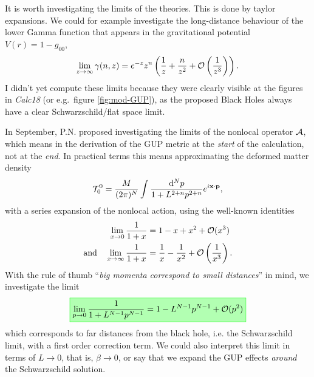 \documentclass[10pt,a4paper]{article}
\newcommand{\highlight}[1]{%
   \fcolorbox{green}{green!30}{$\displaystyle#1$}%
}
\begin{document}
It is worth investigating the limits of the theories. This is done by taylor expansions. We could for example investigate the long-distance behaviour of the lower Gamma function that appears in the gravitational potential $V(r) = 1-g_{00}$,
\begin{equation}\label{eq:gamma-approx}
\lim_{z\to \infty} \gamma(n, z) = e^{-z} z^n \left(
\frac 1z + \frac n{z^2} + {\cal O}\left( \frac 1{z^3} \right) \right).
\end{equation}
I didn't yet compute these limits because they were clearly visible at the figures in \emph{Calc18} (or e.g.\ figure \ref{fig:mod-GUP}), as the proposed Black Holes always have a clear Schwarzschild/flat space limit.

In September, P.N. proposed investigating the limits of the nonlocal operator ${\cal A}$, which means in the derivation of the GUP metric \cite{work} at the \emph{start} of the calculation, not at the \emph{end}. In practical terms this means approximating the deformed matter density
\begin{equation}\label{eq:rho}
{\cal T}^0_0 = \frac{M}{(2\pi)^N}
\int \frac{\mathrm{d}^N p}{1 + L^{2+n} p^{2+n}} e^{i \mathbf{ x } \cdot \mathbf{ p }},
\end{equation}
with a series expansion of the nonlocal action, using the well-known identities
\begin{align}\label{eq:series1}
\lim_{x\to 0} \frac{1}{1+x} &= 1 - x + x^2 + {\cal O}(x^3)
\\
\text{and}\quad
\lim_{x\to \infty} \frac 1{1+x} &= \frac 1x - \frac 1{x^2} + {\cal O}\left( \frac 1{x^3} \right).
\end{align}
With the rule of thumb ``\emph{big momenta correspond to small distances}'' in mind, we investigate the limit
\begin{equation}\label{eq:PN-limit}
\highlight{
\lim_{p\to 0} \frac{1}{1+L^{N-1}p^{N-1}} = 1 - L^{N-1} p^{N-1} + \C O(p^2)
}%
\end{equation}
which corresponds to far distances from the black hole, i.e. the Schwarzschild limit, with a first order correction term. We could also interpret this limit in terms of $L\to 0$, that is, $\beta \to 0$, or say that we expand the GUP effects \emph{around} the Schwarzschild solution.
\end{document}
